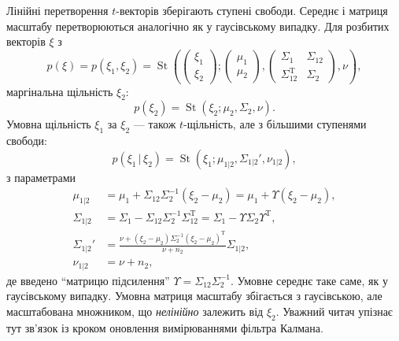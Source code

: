 \documentclass[]{article}
\newcommand{\gvn}{\,|\,}
\newcommand{\bbm}{\begin{pmatrix}}
\newcommand{\ebm}{\end{pmatrix}}
\newcommand{\inv}{^{-1}}
\newcommand{\T}{^{\mathrm{T}}}
\DeclareMathOperator{\St}{St}
\begin{document}
Лінійні перетворення $t$-векторів зберігають ступені свободи. Середнє і матриця масштабу перетворюються аналогічно як у гаусівському випадку. Для розбитих векторів $\xi$ з
\begin{equation}\label{eq:tDensJoint}
p(\xi) = p(\xi_1, \xi_2) = \St\left(\bbm \xi_1\\ \xi_2 \ebm; \bbm \mu_1\\ \mu_2 \ebm, \bbm \Sigma_1 & \Sigma_{12}\\ \Sigma_{12}\T & \Sigma_2\ebm, \nu\right),
\end{equation}
маргінальна щільність $\xi_2$:
\begin{equation}\label{eq:tDensMarg}
p(\xi_2) = \St(\xi_2; \mu_2, \Sigma_2, \nu).
\end{equation}
Умовна щільність $\xi_1$ за $\xi_2$ — також $t$-щільність, але з більшими ступенями свободи:
\begin{equation}\label{eq:tDensCond}
p(\xi_1\gvn \xi_2) = \St(\xi_1; \mu_{1|2}, \Sigma_{1|2}', \nu_{1|2}),
\end{equation}
з параметрами
\begin{subequations}\label{eq:condParams}
\begin{align}
\mu_{1|2} &= \mu_1 + \Sigma_{12}\Sigma_{2}\inv(\xi_2-\mu_2) = \mu_1 + \Upsilon(\xi_2-\mu_2),\\
\Sigma_{1|2} &= \Sigma_1-\Sigma_{12}\Sigma_2\inv\Sigma_{12}\T = \Sigma_1-\Upsilon \Sigma_2 \Upsilon\T,\\
\Sigma_{1|2}' &= \tfrac{\nu + (\xi_2-\mu_2)\Sigma_2\inv(\xi_2-\mu_2)\T}{\nu + n_2} \Sigma_{1|2},\\
\nu_{1|2} &= \nu+n_2,
\end{align}
\end{subequations}
де введено ``матрицю підсилення'' $\Upsilon=\Sigma_{12}\Sigma_{2}\inv$. Умовне середнє таке саме, як у гаусівському випадку. Умовна матриця масштабу збігається з гаусівською, але масштабована множником, що \emph{нелінійно} залежить від $\xi_2$. Уважний читач упізнає тут зв'язок із кроком оновлення вимірюваннями фільтра Калмана.
\end{document}
